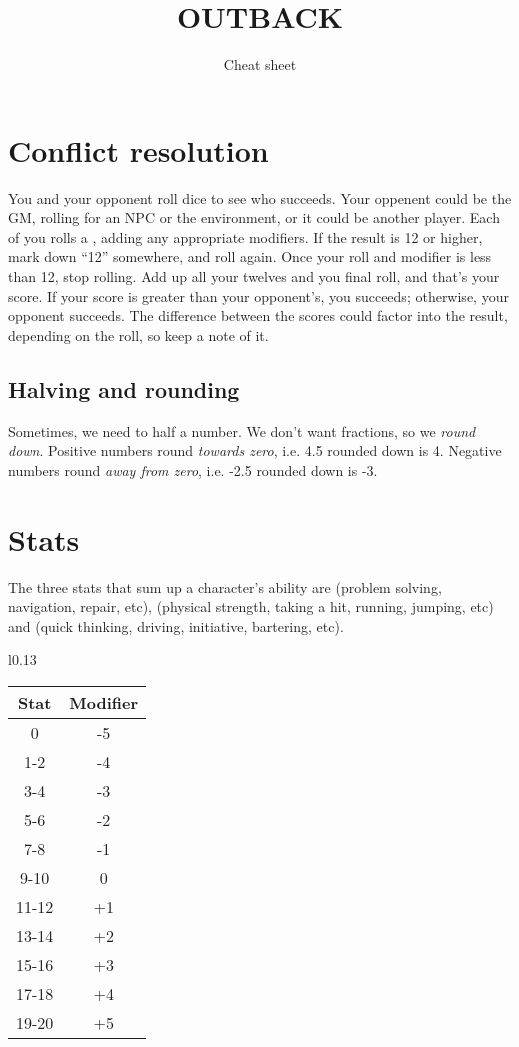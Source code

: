 \documentclass[10pt, a4paper, twocolumn]{article}
\title{\uppercase{Outback}}
\subtitle{Cheat sheet}
\date{}
\begin{document}
\maketitle

\section{Conflict resolution}
You and your opponent roll dice to see who succeeds. Your oppenent could be the
GM, rolling for an NPC or the environment, or it could be another player. Each
of you rolls a , adding any appropriate modifiers. If the result is 12
or higher, mark down ``12'' somewhere, and roll again. Once your roll and
modifier is less than 12, stop rolling. Add up all your twelves and you final
roll, and that's your score. If your score is greater than your
opponent's, you succeeds; otherwise, your opponent succeeds. The difference
between the scores could factor into the result, depending on the roll, so keep
a note of it.

\subsection{Halving and rounding}
Sometimes, we need to half a number. We don't want fractions, so we
\emph{round down}. Positive numbers round \emph{towards zero}, i.e. 4.5
rounded down is 4. Negative numbers round \emph{away from zero}, i.e. -2.5
rounded down is -3.

\section{Stats}
The three stats that sum up a character's ability are  (problem
solving, navigation, repair,  etc),  (physical strength, taking a
hit, running, jumping, etc) and  (quick thinking, driving,
initiative, bartering, etc).

\begin{wraptable}[11]{l}{0.13\textwidth}
\vspace*{-3ex}
\begin{tabular}{cc}
  Stat  & Modifier \\
  \hline 
  0     & -5       \\
  1-2   & -4       \\
  3-4   & -3       \\
  5-6   & -2       \\
  7-8   & -1       \\
  9-10  &  0       \\
  11-12 & +1       \\
  13-14 & +2       \\
  15-16 & +3       \\
  17-18 & +4       \\
  19-20 & +5
\end{tabular}
\vspace*{-10pt}
\end{wraptable}
\end{document}
